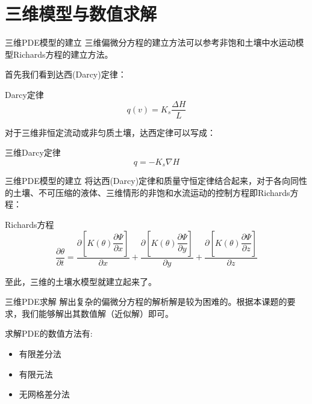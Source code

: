 \documentclass[xcolor=dvipsnames]{beamer}
\begin{document}
\section{三维模型与数值求解}
	\begin{frame}{三维PDE模型的建立}
	三维偏微分方程的建立方法可以参考非饱和土壤中水运动模型Richards方程的建立方法。\par
	首先我们看到达西(Darcy)定律：
	\begin{block}{\fangsong Darcy定律}
	\begin{equation}\label{equ:daxi}
	q(v)=K_s\dfrac{\Delta H}{L}
	\end{equation}
	\end{block}
	对于三维非恒定流动或非匀质土壤，达西定律可以写成：
	\begin{exampleblock}{\fangsong 三维Darcy定律}
	\begin{equation}\label{equ:sanwei_daxi}
	q=-K_s\nabla H
	\end{equation}
	\end{exampleblock}
	\end{frame}
	\begin{frame}{三维PDE模型的建立}
	将达西(Darcy)定律和质量守恒定律结合起来，对于各向同性的土壤、不可压缩的液体、三维情形的非饱和水流运动的控制方程即Richards方程：
	\begin{block}{\fangsong Richards方程}
		\begin{equation}\label{equ:Richards_3}
	\dfrac{\partial \theta}{\partial t}=\dfrac{\partial \left[K(\theta)\dfrac{\partial\Psi}{\partial x}\right]}{\partial x}+\dfrac{\partial 				    \left[K(\theta)\dfrac{\partial\Psi}{\partial y}\right]}{\partial y}+\dfrac{\partial \left[K(\theta)\dfrac{\partial\Psi}{\partial  z}\right]}{\partial z}
    \end{equation}
	\end{block}
	至此，三维的土壤水模型就建立起来了。
	\end{frame}
	\begin{frame}{三维PDE求解}
	解出复杂的偏微分方程的解析解是较为困难的。根据本课题的要求，我们能够解出其数值解（近似解）即可。\par
	求解PDE的数值方法有:
	\begin{itemize}
	\fangsong
	\item 有限差分法
	\item 有限元法
	\item 无网格差分法
	\end{itemize}
	\end{frame}
\end{document}
